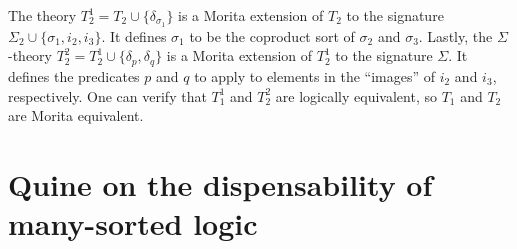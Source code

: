 \begin{example}
The theory $T_2^1=T_2\cup\{\delta_{\sigma_1}\}$ is a Morita extension of $T_2$ to the signature $\Sigma_2\cup\{\sigma_1, i_2, i_3\}$. It defines $\sigma_1$ to be the coproduct sort of $\sigma_2$ and $\sigma_3$. Lastly, the $\Sigma$-theory $T_2^2=T_2^1\cup\{\delta_p, \delta_q\}$ is a Morita extension of $T_2^1$ to the signature $\Sigma$. It defines the predicates $p$ and $q$ to apply to elements in the ``images'' of $i_2$ and $i_3$, respectively.
%
One can verify that $T_1^1$ and $T_2^2$ are logically equivalent, so
$T_1$ and $T_2$ are Morita equivalent.
\end{example}


\section{Quine on the dispensability of many-sorted
  logic} \label{quine-sort}

